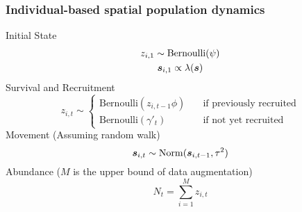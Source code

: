 \documentclass[color=usenames,dvipsnames]{beamer}\usepackage[]{graphicx}\usepackage[]{color}
\begin{document}




\begin{frame}
  \frametitle{\Large Individual-based spatial population dynamics}
  {Initial State}
  \begin{gather*}
    z_{i,1} \sim \mbox{Bernoulli}(\psi) \\
    {\bm s}_{i,1} \propto \lambda({\bm s})
  \end{gather*}
  \vfill
  Survival and Recruitment
  \[
    z_{i,t} \sim
    \begin{cases}
      \mbox{Bernoulli}(z_{i,t-1}\phi) & \quad \text{if previously recruited} \\
      \mbox{Bernoulli}(\gamma'_t) & \quad \text{if not yet recruited} 
    \end{cases}
  \]
  \vfill
  Movement (Assuming random walk)
  \[
    {\bm s}_{i,t} \sim \mathrm{Norm}({\bm s}_{i,t-1}, \tau^2)  
  \]
  \vfill
  Abundance ($M$ is the upper bound of data augmentation)
  \[
    N_t = \sum_{i=1}^M z_{i,t}
  \]
\end{frame}
\end{document}
